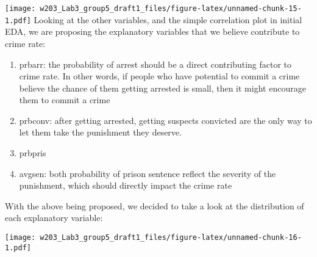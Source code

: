 \documentclass[]{article}
\newenvironment{Shaded}{\begin{snugshade}}{\end{snugshade}}
\newcommand{\KeywordTok}[1]{\textcolor[rgb]{0.13,0.29,0.53}{\textbf{#1}}}
\newcommand{\DataTypeTok}[1]{\textcolor[rgb]{0.13,0.29,0.53}{#1}}
\newcommand{\DecValTok}[1]{\textcolor[rgb]{0.00,0.00,0.81}{#1}}
\newcommand{\StringTok}[1]{\textcolor[rgb]{0.31,0.60,0.02}{#1}}
\newcommand{\CommentTok}[1]{\textcolor[rgb]{0.56,0.35,0.01}{\textit{#1}}}
\newcommand{\OperatorTok}[1]{\textcolor[rgb]{0.81,0.36,0.00}{\textbf{#1}}}
\newcommand{\NormalTok}[1]{#1}
\providecommand{\tightlist}{%
  \setlength{\itemsep}{0pt}\setlength{\parskip}{0pt}}
\begin{document}
\begin{Shaded}
\end{Shaded}

\texttt{[image: w203\_Lab3\_group5\_draft1\_files/figure-latex/unnamed-chunk-15-1.pdf]}
Looking at the other variables, and the simple correlation plot in
initial EDA, we are proposing the explanatory variables that we believe
contribute to crime rate:

\begin{enumerate}
\def\labelenumi{\arabic{enumi}.}
\tightlist
\item
  prbarr: the probability of arrest should be a direct contributing
  factor to crime rate. In other words, if people who have potential to
  commit a crime believe the chance of them getting arrested is small,
  then it might encourage them to commit a crime
\item
  prbconv: after getting arrested, getting suspects convicted are the
  only way to let them take the punishment they deserve.
\item
  prbpris
\item
  avgsen: both probability of prison sentence reflect the severity of
  the punishment, which should directly impact the crime rate
\end{enumerate}

With the above being proposed, we decided to take a look at the
distribution of each explanatory variable:

\begin{Shaded}
\end{Shaded}

\texttt{[image: w203\_Lab3\_group5\_draft1\_files/figure-latex/unnamed-chunk-16-1.pdf]}
\end{document}
